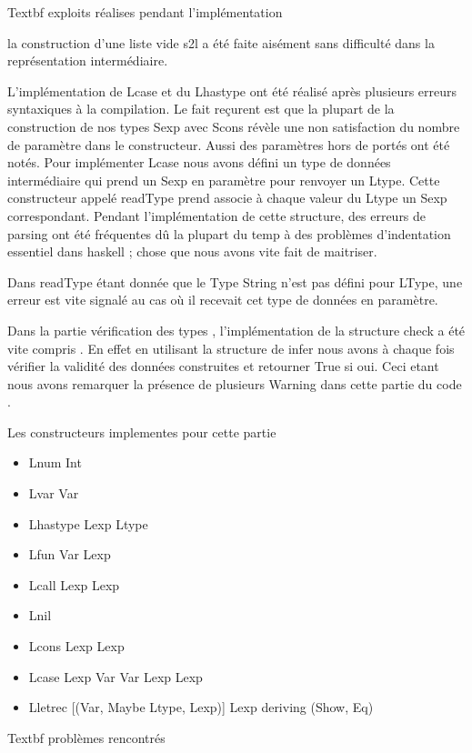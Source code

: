 \documentclass{article}
\begin{document}
 

Textbf {exploits réalises pendant l'implémentation}

 

la construction d'une liste vide s2l a été faite aisément  sans difficulté dans la représentation intermédiaire.

L’implémentation de Lcase et du Lhastype ont été réalisé après plusieurs erreurs syntaxiques à la compilation. Le fait reçurent est que la plupart de la construction de nos types Sexp avec Scons révèle une non satisfaction du nombre de paramètre dans le constructeur. Aussi des paramètres hors de portés ont été notés.  Pour implémenter Lcase nous avons défini un type de données intermédiaire qui prend un Sexp en paramètre pour renvoyer un Ltype. Cette constructeur appelé readType prend associe à chaque valeur du Ltype un Sexp correspondant. Pendant l’implémentation de cette structure, des erreurs de parsing ont été fréquentes dû la plupart du temp à des problèmes d’indentation essentiel dans haskell ; chose que nous avons vite fait de maitriser.

Dans readType  étant donnée que le Type String n’est pas défini pour LType, une erreur est vite signalé au cas où il recevait cet type de données en paramètre.

 

Dans la partie vérification des types , l’implémentation de la structure check a été vite compris . En effet en utilisant la structure de infer  nous avons à chaque fois vérifier la validité des données construites et retourner True si oui. Ceci etant nous avons remarquer la présence de plusieurs Warning dans cette partie du code .

Les constructeurs implementes pour cette partie 

\begin{itemize}  
\item Lnum Int 
\item Lvar Var
\item Lhastype Lexp Ltype
\item Lfun Var Lexp
\item Lcall Lexp Lexp
\item Lnil
\item Lcons Lexp Lexp
 \item Lcase Lexp Var Var Lexp Lexp
\item Lletrec [(Var, Maybe Ltype, Lexp)] Lexp deriving (Show, Eq)
\end{itemize}
Textbf {problèmes rencontrés}
\end{document}
